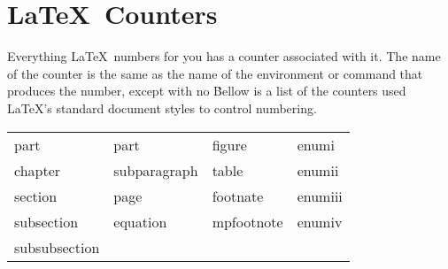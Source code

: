 

\chapter{\LaTeX~Counters}

Everything \LaTeX~numbers for you has a counter associated with it. The name of the counter is the same as the name of the environment or command that produces the number, except with no \. Bellow is a list of the counters used \LaTeX 's standard document styles to control numbering.

\noindent\vspace{1em}
\begin{tabular}[0em]{@{} l l l l}
	part       & part         & figure     & enumi\\
	chapter    & subparagraph & table      & enumii\\
	section    & page         & footnate   & enumiii\\
	subsection & equation     & mpfootnote & enumiv\\
	subsubsection
\end{tabular}
\vspace{1em}

